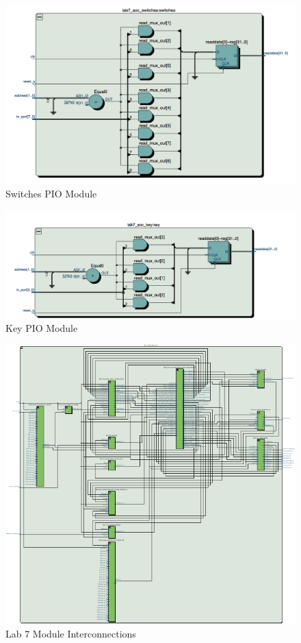 \documentclass[journal, twocolumn, final,11pt,letterpaper]{IEEEtran}
\begin{document}
\begin{figure} [H]
	\centering
	\includegraphics[scale=0.4]{switches_pio_module.png}
	\caption{Switches PIO Module\label{fig:switch-pio}}
\end{figure}

\begin{figure} [H]
	\centering
	\includegraphics[scale=0.4]{key_pio_module.png}
	\caption{Key PIO Module\label{fig:key-pio}}
\end{figure}

\begin{figure} [H]
	\centering
	\includegraphics[scale=1.72]{top-level-circuit.pdf}
	\caption{Lab 7 Module Interconnections\label{fig:top-level-interconn}}
\end{figure}


\end{document}
